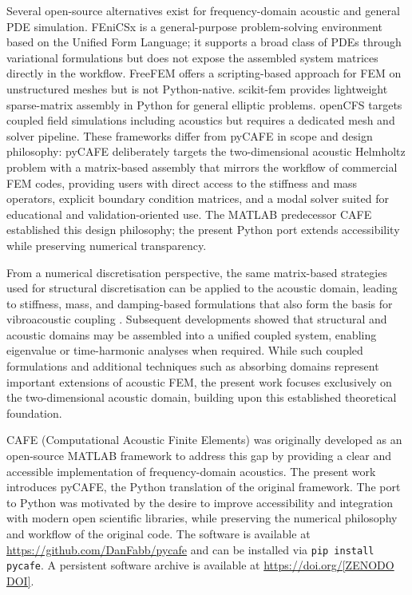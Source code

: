 \documentclass{jors}
\begin{document}
Several open-source alternatives exist for frequency-domain acoustic and general PDE simulation. FEniCSx \cite{FEniCSx2023} is a general-purpose problem-solving environment based on the Unified Form Language; it supports a broad class of PDEs through variational formulations but does not expose the assembled system matrices directly in the workflow. FreeFEM \cite{Hecht2012} offers a scripting-based approach for FEM on unstructured meshes but is not Python-native. scikit-fem \cite{skfem2020} provides lightweight sparse-matrix assembly in Python for general elliptic problems. openCFS \cite{openCFS2022} targets coupled field simulations including acoustics but requires a dedicated mesh and solver pipeline. These frameworks differ from pyCAFE in scope and design philosophy: pyCAFE deliberately targets the two-dimensional acoustic Helmholtz problem with a matrix-based assembly that mirrors the workflow of commercial FEM codes, providing users with direct access to the stiffness and mass operators, explicit boundary condition matrices, and a modal solver suited for educational and validation-oriented use. The MATLAB predecessor CAFE \cite{Fabbri2025} established this design philosophy; the present Python port extends accessibility while preserving numerical transparency.

From a numerical discretisation perspective, the same matrix-based strategies used for structural discretisation can be applied to the acoustic domain, leading to stiffness, mass, and damping-based formulations that also form the basis for vibroacoustic coupling \cite{Nefske1976,Beriot2021}. Subsequent developments showed that structural and acoustic domains may be assembled into a unified coupled system, enabling eigenvalue or time-harmonic analyses when required. While such coupled formulations and additional techniques such as absorbing domains \cite{Turkel1998,Pekel1995,Reheman2013} represent important extensions of acoustic FEM, the present work focuses exclusively on the two-dimensional acoustic domain, building upon this established theoretical foundation.

CAFE (Computational Acoustic Finite Elements) \cite{Fabbri2025} was originally developed as an open-source MATLAB framework to address this gap by providing a clear and accessible implementation of frequency-domain acoustics. The present work introduces pyCAFE, the Python translation of the original framework. The port to Python was motivated by the desire to improve accessibility and integration with modern open scientific libraries, while preserving the numerical philosophy and workflow of the original code. The software is available at \url{https://github.com/DanFabb/pycafe} and can be installed via \texttt{pip install pycafe}. A persistent software archive is available at \url{https://doi.org/[ZENODO DOI]}.
\end{document}
